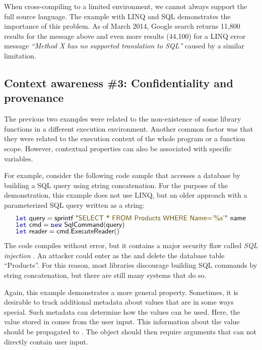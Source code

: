 When cross-compiling to a limited environment, we cannot always support the full source language.
The example with LINQ and SQL demonstrates the importance of this problem. As of March 2014,
Google search returns 11,800 results for the message above and even more results (44,100) for a
LINQ error message \emph{``Method X has no supported translation to SQL''} caused by a similar
limitation.


\subsection{Context awareness \#3: Confidentiality and provenance}

The previous two examples were related to the non-existence of some library functions in a different
execution environment. Another common factor was that they were related to the execution context of
the whole program or a function scope. However, contextual properties can also be associated with
specific variables.

For example, consider the following code sample that accesses a database by building a SQL query
using string concatenation. For the purpose of the demonstration, this example does not use LINQ,
but an older approach with a parameterized SQL query written as a string:
%
\begin{equation*}
\begin{array}{l}
\kvd{let}~\ident{query} = \ident{sprintf}~\str{SELECT * FROM Products WHERE Name='\%s'}~\ident{name}\\[-0.25em]
\kvd{let}~\ident{cmd} = \kvd{new}~\ident{SqlCommand}(\ident{query})\\[-0.25em]
\kvd{let}~\ident{reader} = \ident{cmd.ExecuteReader}()
\end{array}
\end{equation*}
%
The code compiles without error, but it contains a major security flaw called \emph{SQL injection}
\cite{app-sql-injection}. An attacker could enter  as the
 and delete the database table ``Products''. For this reason, most libraries discourage
building SQL commands by string concatenation, but there are still many systems that do so.

Again, this example demonstrates a more general property. Sometimes, it is desirable to track additional
metadata about values that are in some ways special. Such metadata can determine how the values
can be used. Here, the value stored in  comes from the user input. This information about 
the value should be propagated to . The  object should then require 
arguments that can not directly contain user input.

